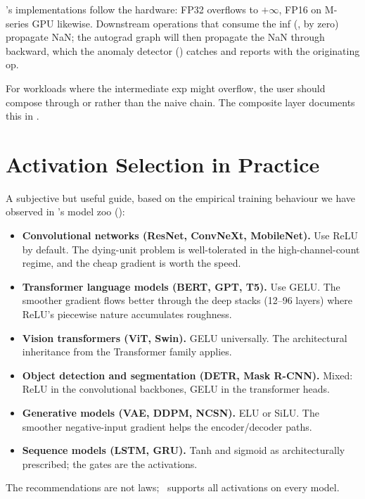 \Lucid's implementations follow the hardware: FP32 
overflows to $+\infty$, FP16  on M-series GPU likewise.
Downstream operations that consume the inf (, 
by zero) propagate NaN; the autograd graph will then propagate the
NaN through backward, which the anomaly detector
() catches and
reports with the originating op.

For workloads where the intermediate exp might overflow, the user
should compose through  or  rather
than the naive chain. The composite layer documents this in
.

\section{Activation Selection in Practice}
\label{sec:unary_functions:selection}

A subjective but useful guide, based on the empirical training
behaviour we have observed in \Lucid's model zoo
():

\begin{itemize}
  \item \textbf{Convolutional networks (ResNet, ConvNeXt, MobileNet).}
    Use ReLU by default. The dying-unit problem is well-tolerated
    in the high-channel-count regime, and the cheap gradient is
    worth the speed.
  \item \textbf{Transformer language models (BERT, GPT, T5).}
    Use GELU. The smoother gradient flows better through the
    deep stacks (12--96 layers) where ReLU's piecewise nature
    accumulates roughness.
  \item \textbf{Vision transformers (ViT, Swin).} GELU
    universally. The architectural inheritance from the Transformer
    family applies.
  \item \textbf{Object detection and segmentation (DETR, Mask
    R-CNN).} Mixed: ReLU in the convolutional backbones, GELU in
    the transformer heads.
  \item \textbf{Generative models (VAE, DDPM, NCSN).} ELU or SiLU.
    The smoother negative-input gradient helps the
    encoder/decoder paths.
  \item \textbf{Sequence models (LSTM, GRU).} Tanh and sigmoid as
    architecturally prescribed; the gates are the activations.
\end{itemize}

The recommendations are not laws; \Lucid\ supports all activations
on every model.

